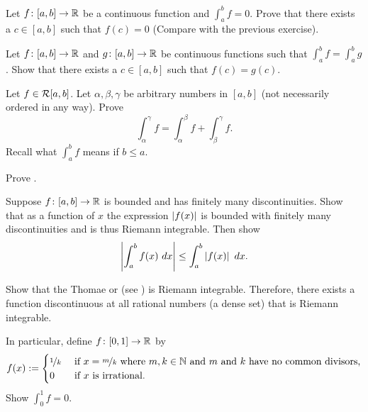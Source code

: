 \begin{exercise}
Let $f \colon [a,b] \to {\mathbb{R}}$ be a continuous function
and $\int_a^b f = 0$.  Prove that
there exists a $c \in [a,b]$ such that $f(c) = 0$ (Compare with the
previous exercise).
\end{exercise}

\begin{exercise}
Let $f \colon [a,b] \to {\mathbb{R}}$ and $g \colon [a,b] \to {\mathbb{R}}$
be continuous functions such that $\int_a^b f = \int_a^b g$.
Show that there exists a $c \in [a,b]$ such that $f(c) = g(c)$.
\end{exercise}

\begin{exercise}
Let $f \in {\mathcal{R}}[a,b]$.  Let $\alpha, \beta, \gamma$ be arbitrary numbers in
$[a,b]$ (not necessarily ordered in any way).  Prove 
\begin{equation*}
\int_\alpha^\gamma f =
\int_\alpha^\beta f +
\int_\beta^\gamma f .
\end{equation*}
Recall what $\int_a^b f$ means if $b \leq a$.
\end{exercise}

\begin{exercise}
Prove .
\end{exercise}

\begin{exercise} \label{exercise:easyabsint}
Suppose $f \colon [a,b] \to {\mathbb{R}}$ is bounded and
has finitely many discontinuities.
Show that as a function of $x$ the expression $\left\lvert {f(x)} \right\rvert$ is bounded with finitely many
discontinuities and is thus Riemann integrable.  Then show 
\begin{equation*}
\left\lvert {\int_a^b f(x)~dx} \right\rvert \leq \int_a^b \left\lvert {f(x)} \right\rvert~dx .
\end{equation*}
\end{exercise}

\begin{exercise}[Hard]
Show that the
Thomae or 
(see )
is Riemann integrable.  Therefore, there exists a
function discontinuous at all rational numbers (a dense set)
that is Riemann integrable.

In particular,
define $f \colon [0,1] \to {\mathbb{R}}$ by
\begin{equation*}
f(x) := 
\begin{cases}
\nicefrac{1}{k} & \text{ if $x=\nicefrac{m}{k}$ where $m,k \in {\mathbb{N}}$
and $m$ and $k$ have no common divisors,} \\
0 & \text{ if $x$ is irrational}.
\end{cases}
\end{equation*}
Show $\int_0^1 f = 0$.
\end{exercise}


